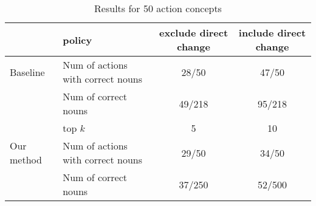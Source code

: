 \begin{table*}[ht]
    \caption{Results for 50 action concepts}
\small
\centering
    \begin{tabular} {l|l|c|c}
    \hline
    & policy & exclude direct change  & include direct change\\
    \hline \hline
   Baseline & Num of actions with correct nouns & 28/50 & 47/50 \\
    \cline{2-4}
    & Num of correct nouns & 49/218 & 95/218 \\
        \hline
        & top $k$ & 5 & 10 \\
    \hline
   Our method & Num of actions with correct nouns & 29/50 & 34/50 \\
    \cline{2-4}
    & Num of correct nouns & 37/250 & 52/500 \\
    \hline

\end{tabular}
\end{table*}
